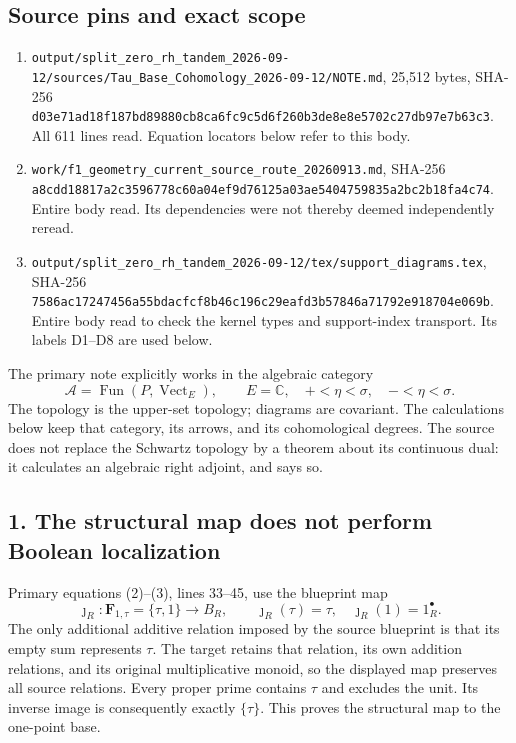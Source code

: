 \documentclass[10pt,a4paper,oneside]{report}
\begin{document}
\subsection{Source pins and exact scope}\label{proof01:source-maps-source-pins-and-exact-scope}

\begin{enumerate}
\def\labelenumi{\arabic{enumi}.}
\item
  \nolinkurl{output/split_zero_rh_tandem_2026-09-12/sources/Tau_Base_Cohomology_2026-09-12/NOTE.md}, 25,512 bytes, SHA-256 \texttt{d03e71ad\allowbreak{}18f187bd\allowbreak{}89880cb8\allowbreak{}ca6fc9c5\allowbreak{}d6f260b3\allowbreak{}de8e8e57\allowbreak{}02c27db9\allowbreak{}7e7b63c3}. All 611 lines read. Equation locators below refer to this body.
\item
  \nolinkurl{work/f1_geometry_current_source_route_20260913.md}, SHA-256 \texttt{a8cdd188\allowbreak{}17a2c359\allowbreak{}6778c60a\allowbreak{}04ef9d76\allowbreak{}125a03ae\allowbreak{}54047598\allowbreak{}35a2bc2b\allowbreak{}18fa4c74}. Entire body read. Its dependencies were not thereby deemed independently reread.
\item
  \nolinkurl{output/split_zero_rh_tandem_2026-09-12/tex/support_diagrams.tex}, SHA-256 \texttt{7586ac17\allowbreak{}247456a5\allowbreak{}5bdacfcf\allowbreak{}8b46c196\allowbreak{}c29eafd3\allowbreak{}b57846a7\allowbreak{}1792e918\allowbreak{}704e069b}. Entire body read to check the kernel types and support-index transport. Its labels D1--D8 are used below.
\end{enumerate}

The primary note explicitly works in the algebraic category \[
\mathcal A=\operatorname{Fun}(P,\operatorname{Vect}_{E}),\qquad E=\mathbb C,
\quad +<\eta<\sigma,\quad -<\eta<\sigma.
\] The topology is the upper-set topology; diagrams are covariant. The calculations below keep that category, its arrows, and its cohomological degrees. The source does not replace the Schwartz topology by a theorem about its continuous dual: it calculates an algebraic right adjoint, and says so.

\subsection{1. The structural map does not perform Boolean localization}\label{proof01:source-maps-the-structural-map-does-not-perform-boolean-localization}

Primary equations (2)--(3), lines 33--45, use the blueprint map \[
\jmath_R:\mathbf F_{1,\tau}=\{\tau,1\}\longrightarrow B_R,
\qquad \jmath_R(\tau)=\tau,\quad\jmath_R(1)=1_R^\bullet.
\] The only additional additive relation imposed by the source blueprint is that its empty sum represents \(\tau\). The target retains that relation, its own addition relations, and its original multiplicative monoid, so the displayed map preserves all source relations. Every proper prime contains \(\tau\) and excludes the unit. Its inverse image is consequently exactly \(\{\tau\}\). This proves the structural map to the one-point base.
\end{document}
